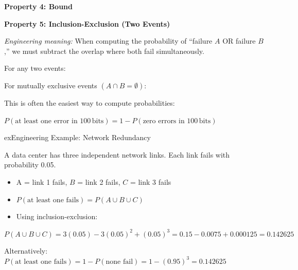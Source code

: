 \textbf{Property 4: Bound}

\textbf{Property 5: Inclusion-Exclusion (Two Events)}

\emph{Engineering meaning:} When computing the probability of ``failure $A$ OR failure $B$,'' we must subtract the overlap where both fail simultaneously.



For any two events:

For mutually exclusive events $(A \cap B = \emptyset)$:



This is often the easiest way to compute probabilities:

\begin{PSquote}

$P(\text{at least one error in 100}\,\mathrm{bits}) = 1 - P(\text{zero errors in 100}\,\mathrm{bits})$

\end{PSquote}



\begin{PSbox}[unbreakable]{ex}{Engineering Example: Network Redundancy}

A data center has three independent network links. Each link fails with probability 0.05.

\begin{itemize}
\tightlist
\item
  A = link 1 fails, $B$ = link 2 fails, $C$ = link 3 fails
\item
  $P(\text{at least one fails}) = P(A \cup B \cup C)$
\item
  Using inclusion-exclusion:
\end{itemize}

$P(A \cup B \cup C) = 3(0.05) - 3(0.05)^{2} + (0.05)^{3} = 0.15 - 0.0075 + 0.000125 = 0.142625$

Alternatively: $P(\text{at least one fails}) = 1 - P(\text{none fail}) = 1 - (0.95)^{3} = 0.142625$ \PSyes{}

\end{PSbox}

